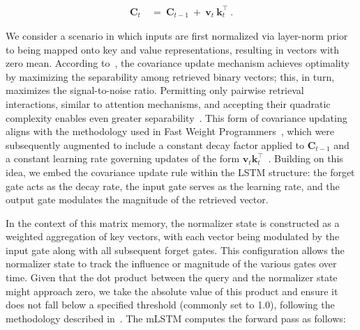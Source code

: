 \begin{align}
\mathbf{C}_t \ &= \ \mathbf{C}_{t-1} \ + \ \mathbf{v}_{t} \ \mathbf{k}_t^\top \ .
\end{align}

We consider a scenario in which inputs are first normalized via layer-norm prior to being mapped onto key and value representations, resulting in vectors with zero mean. According to~\citep{Dayan:91}, the covariance update mechanism achieves optimality by maximizing the separability among retrieved binary vectors; this, in turn, maximizes the signal-to-noise ratio. Permitting only pairwise retrieval interactions, similar to attention mechanisms, and accepting their quadratic complexity enables even greater separability~\citep{Krotov:16,Krotov:17,Ramsauer:21}. This form of covariance updating aligns with the methodology used in Fast Weight Programmers~\citep{Schmidhuber:92ncfastweights,Schlag:21}, which were subsequently augmented to include a constant decay factor applied to $\mathbf{C}_{t-1}$ and a constant learning rate governing updates of the form 
$\mathbf{v}_{t} \mathbf{k}_t ^\top$~\citep{Ba:16}.
Building on this idea, we embed the covariance update rule within the LSTM structure: the forget gate acts as the decay rate, the input gate serves as the learning rate, and the output gate modulates the magnitude of the retrieved vector.

In the context of this matrix memory, the normalizer state is constructed as a weighted aggregation of key vectors, with each vector being modulated by the input gate along with all subsequent forget gates. This configuration allows the normalizer state to track the influence or magnitude of the various gates over time. Given that the dot product between the query and the normalizer state might approach zero, we take the absolute value of this product and ensure it does not fall below a specified threshold (commonly set to 1.0), following the methodology described in~\citep{Sun:23arxiv}. The mLSTM computes the forward pass as follows:

